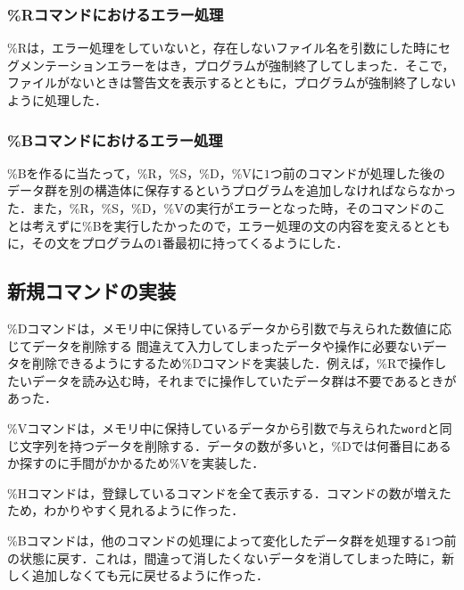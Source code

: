 \documentclass[a4j,11pt]{jarticle}
\begin{document}
\subsubsection{\%Rコマンドにおけるエラー処理}
\%Rは，エラー処理をしていないと，存在しないファイル名を引数にした時にセグメンテーションエラーをはき，プログラムが強制終了してしまった．そこで，ファイルがないときは警告文を表示するとともに，プログラムが強制終了しないように処理した．

\subsubsection{\%Bコマンドにおけるエラー処理}
\%Bを作るに当たって，\%R，\%S，\%D，\%Vに$1$つ前のコマンドが処理した後のデータ群を別の構造体に保存するというプログラムを追加しなければならなかった．また，\%R，\%S，\%D，\%Vの実行がエラーとなった時，そのコマンドのことは考えずに\%Bを実行したかったので，エラー処理の文の内容を変えるとともに，その文をプログラムの$1$番最初に持ってくるようにした．

\subsection{新規コマンドの実装}
\%Dコマンドは，メモリ中に保持しているデータから引数で与えられた数値に応じてデータを削除する
間違えて入力してしまったデータや操作に必要ないデータを削除できるようにするため\%Dコマンドを実装した．例えば，\%Rで操作したいデータを読み込む時，それまでに操作していたデータ群は不要であるときがあった． 

\%Vコマンドは，メモリ中に保持しているデータから引数で与えられた\verb|word|と同じ文字列を持つデータを削除する．データの数が多いと，\%Dでは何番目にあるか探すのに手間がかかるため\%Vを実装した．

\%Hコマンドは，登録しているコマンドを全て表示する．コマンドの数が増えたため，わかりやすく見れるように作った．

\%Bコマンドは，他のコマンドの処理によって変化したデータ群を処理する$1$つ前の状態に戻す．これは，間違って消したくないデータを消してしまった時に，新しく追加しなくても元に戻せるように作った．

\end{document}
